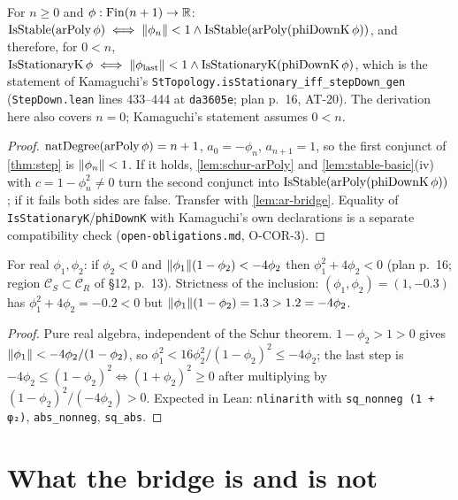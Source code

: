 \begin{corollary}\label{cor:3}
For $n\ge0$ and $\phi:\mathrm{Fin}(n+1)\to\mathbb{R}$:
$\mathrm{IsStable}(\mathrm{arPoly}\,\phi)\iff\lVert \phi_n \rVert<1\wedge\mathrm{IsStable}(\mathrm{arPoly}(\mathrm{phiDownK}\,\phi))$,
and therefore, for $0<n$,
$\mathrm{IsStationaryK}\,\phi\iff\lVert \phi_{\mathrm{last}} \rVert<1\wedge\mathrm{IsStationaryK}(\mathrm{phiDownK}\,\phi)$,
which is the statement of Kamaguchi's \texttt{StTopology.isStationary\_iff\_stepDown\_gen}
(\texttt{StepDown.lean} lines 433--444 at \texttt{da3605e}; plan p.~16, AT-20).
The derivation here also covers $n=0$; Kamaguchi's statement assumes $0<n$.
\end{corollary}
\begin{proof}
$\mathrm{natDegree}(\mathrm{arPoly}\,\phi)=n+1$, $a_0=-\phi_n$, $a_{n+1}=1$, so the first
conjunct of \ref{thm:step} is $\lVert \phi_n \rVert<1$. If it holds,
\ref{lem:schur-arPoly} and \ref{lem:stable-basic}(iv) with $c=1-\phi_n^2\ne0$
turn the second conjunct into $\mathrm{IsStable}(\mathrm{arPoly}(\mathrm{phiDownK}\,\phi))$;
if it fails both sides are false. Transfer with \ref{lem:ar-bridge}. Equality of
\texttt{IsStationaryK}/\texttt{phiDownK} with Kamaguchi's own declarations is a
separate compatibility check (\texttt{open-obligations.md}, O-COR-3).
\end{proof}

\begin{corollary}\label{cor:4}
For real $\phi_1,\phi_2$: if $\phi_2<0$ and $\lVert \phi_1 \rVert(1-\phi_2)<-4\phi_2$ then
$\phi_1^2+4\phi_2<0$ (plan p.~16; region $\mathcal C_S\subset\mathcal C_R$ of
\S12, p.~13). Strictness of the inclusion: $(\phi_1,\phi_2)=(1,-0.3)$ has
$\phi_1^2+4\phi_2=-0.2<0$ but $\lVert \phi_1 \rVert(1-\phi_2)=1.3>1.2=-4\phi_2$.
\end{corollary}
\begin{proof}
Pure real algebra, independent of the Schur theorem. $1-\phi_2>1>0$ gives
$\lVert \phi_1 \rVert<-4\phi_2/(1-\phi_2)$, so
$\phi_1^2<16\phi_2^2/(1-\phi_2)^2\le-4\phi_2$; the last step is
$-4\phi_2\le(1-\phi_2)^2\iff(1+\phi_2)^2\ge0$ after multiplying by
$(1-\phi_2)^2/(-4\phi_2)>0$. Expected in Lean: \texttt{nlinarith} with
\texttt{sq\_nonneg (1 + φ₂)}, \texttt{abs\_nonneg}, \texttt{sq\_abs}.
\end{proof}

\section{What the bridge is and is not}\label{sec:bridge-remark}

